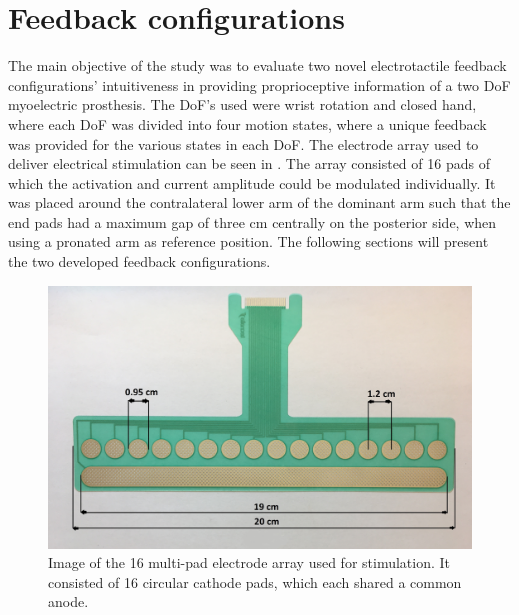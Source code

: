 \section{Feedback configurations}
The main objective of the study was to evaluate two novel electrotactile feedback configurations' intuitiveness in providing proprioceptive information of a two DoF myoelectric prosthesis. The DoF's used were wrist rotation and closed hand, where each DoF was divided into four motion states, where a unique feedback was provided for the various states in each DoF. The electrode array used to deliver electrical stimulation can be seen in . The array consisted of 16 pads of which the activation and current amplitude could be modulated individually. It was placed around the contralateral lower arm of the dominant arm such that the end pads had a maximum gap of three cm centrally on the posterior side, when using a pronated arm as reference position. The following sections will present the two developed feedback configurations. 

\begin{figure}[H]                 
	\includegraphics[width=.4\textwidth]{figures/electrode}  
	\caption{Image of the 16 multi-pad electrode array used for stimulation. It consisted of 16 circular cathode pads, which each shared a common anode.}
	\label{fig:pa:electrode} 
\end{figure}

